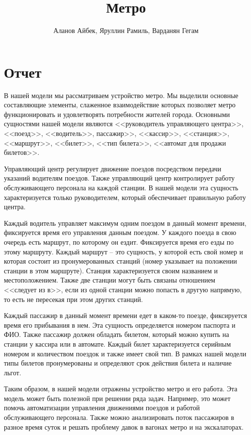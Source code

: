 \documentclass[a4paper,10pt]{article}
\title{\textbf{Метро}}
\author{Аланов Айбек, Яруллин Рамиль, Варданян Гегам}
\theoremstyle{plain} %
\theoremstyle{definition} %
\theoremstyle{remark} %
\theoremstyle{definition}
\begin{document}
	\maketitle
	
\section{Отчет}

	В нашей модели мы рассматриваем устройство метро. Мы выделили основные составляющие элементы, слаженное взаимодействие которых позволяет метро функционировать и 
	удовлетворять потребности жителей города. Основными сущностями нашей модели являются <<руководитель управляющего центра>>, <<поезд>>, <<водитель>>, пассажир>>, <<кассир>>, <<станция>>, <<маршрут>>, <<билет>>, <<тип билета>>, <<автомат для продажи билетов>>. 
	
	Управляющий центр регулирует движение поездов посредством передачи указаний водителям поездов. Также управляющий центр контролирует работу обслуживающего персонала на каждой
	станции. В нашей модели эта сущность характеризуется только руководителем, который обеспечивает правильную работу центра. 
	
	Каждый водитель управляет максимум одним поездом в данный момент времени, фиксируется время его управления данным поездом. У каждого поезда в свою очередь есть маршрут, по 
	которому он ездит. Фиксируется время его езды по этому маршруту. Каждый маршрут -- это сущность, у которой есть свой номер и которая состоит из пронумерованных станций (номер
	указывает на положении станции в этом маршруте). Станция характеризуется своим названием и местоположением. Также две станции могут быть связаны отношением <<следует из в>>, если 
	из одной станции можно попасть в другую напрямую, то есть не пересекая при этом других станций. 
	
	Каждый пассажир в данный момент времени едет в каком-то поезде, фиксируется время его прибывания в нем. Эта сущность определяется номером паспорта и ФИО. Также пассажир должен
	обладать билетом, который можно купить на станции у кассира или в автомате. Каждый билет характеризуется серийным номером и количеством
	поездок и также имеет свой тип. В рамках нашей модели типы билетов пронумерованы и определяют срок действия билета и наличие льгот. 
	
	Таким образом, в нашей модели отражены устройство метро и его работа. Эта модель может быть полезной при решении ряда задач. Например, это может помочь автоматизации управления 
	движениями поездов и работой обслуживающего персонала. Также можно анализировать поток пассажиров в разное время суток и решать проблему давок в вагонах метро и на экскалаторах.
\end{document}
